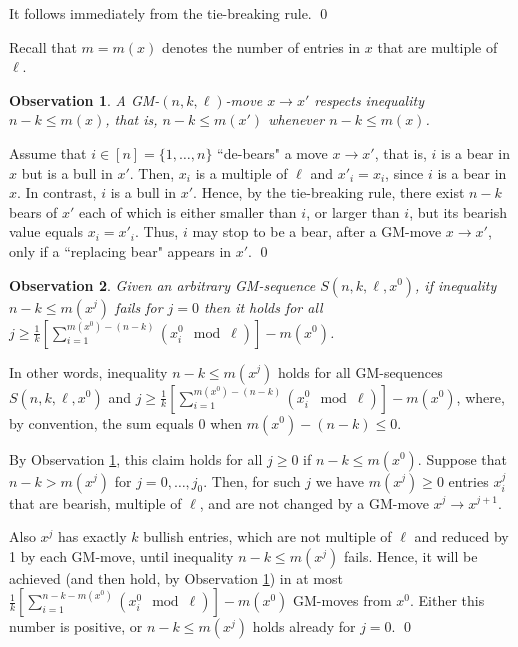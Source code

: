 \documentclass[10pt]{article}
\newtheorem{observation}{Observation}
\theoremstyle{definition}
\begin{document}
\proof 
It follows immediately from the tie-breaking rule. 
\qed 

\medskip 

Recall that $m = m(x)$ denotes the number of entries in $x$  
that are multiple of  $\ell$. 

\begin{observation}
\label{o2}
A GM-$(n,k,\ell)$-move $x \to x'$ 
respects inequality  $n-k \leq m(x)$,  
that is, $n-k \leq m(x')$  whenever $n-k \leq m(x)$.  
\end{observation}

\proof 
Assume that $i \in [n] = \{1,\ldots,n\}$ 
``de-bears"  a move $x \to x'$, 
that is, $i$ is a bear in $x$  but is a bull in $x'$. 
Then, $x_i$  is a multiple of $\ell$ and $x'_i = x_i$, 
since $i$ is a bear in $x$. 
In contrast, $i$  is a bull in $x'$.
Hence, by the tie-breaking rule, 
there exist $n-k$ bears of $x'$ 
each of which is either smaller than $i$, 
or larger than $i$, but its 
bearish value equals  $x_i = x'_i$. 
Thus, $i$  may stop to be a bear,  
after a GM-move $x \to x'$,  
only if a ``replacing bear" appears in  $x'$.
\qed 

\begin{observation}
\label{o3}
Given an arbitrary GM-sequence $S(n,k,\ell,x^0)$,
if inequality  $n-k \leq m(x^j)$ fails for $j=0$ 
then it holds for all  $j \geq \frac{1}{k} 
[\sum_{i=1}^{m(x^0)-(n-k)} (x_i^0 \mod \ell)] - m(x^0)$. 
\end{observation} 

In other words, inequality $n-k \leq m(x^j)$ 
holds for all GM-sequences $S(n,k,\ell,x^0)$  
and  $j \geq \frac{1}{k} 
[\sum_{i=1}^{m(x^0)-(n-k)} (x_i^0 \mod \ell)] - m(x^0)$, 
where, by convention, the sum equals 0 when $m(x^0)-(n-k) \leq 0$.

\proof 
By Observation \ref{o2}, 
this claim holds for all $j \geq 0$ if  $n-k \leq m(x^0)$.
Suppose that  $n-k > m(x^j)$  for $j = 0, \dots, j_0$.
Then,  for such  $j$  we have 
$m(x^j) \geq 0$  entries $x_i^j$  
that are bearish,  multiple of $\ell$, and 
are not changed by a GM-move $x^j \to x^{j+1}$. 

Also  $x^j$  has exactly $k$  bullish entries, 
which are not multiple of $\ell$  
and reduced by 1 by each GM-move,  
until inequality  $n-k \leq m(x^j)$ fails.
Hence, it will be achieved 
(and then hold, by Observation \ref{o2}) 
in at most 
$\frac{1}{k} [\sum_{i=1}^{n-k-m(x^0)} (x_i^0 \mod \ell)] - m(x^0)$ 
GM-moves from $x^0$. 
Either this number is positive, 
or $n-k \leq m(x^j)$ holds already for $j=0$. 
\qed 
\end{document}
